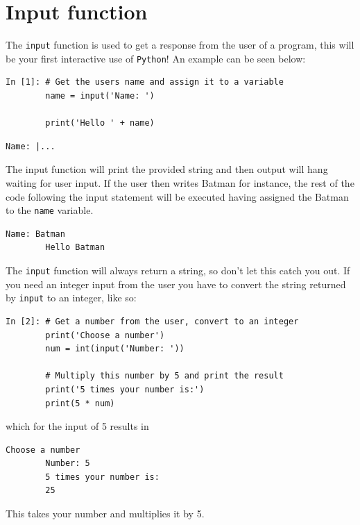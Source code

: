 \section{Input function}
The \texttt{input} function is used to get a response from the user of a program, this will be your first interactive use of \texttt{Python}! An example can be seen below:
\begin{lstlisting}[style=PY] 
In [1]: # Get the users name and assign it to a variable
        name = input('Name: ')
        
        print('Hello ' + name)
\end{lstlisting}
\begin{lstlisting}[style=PY_out] 
        Name: |...
\end{lstlisting}
The input function will print the provided string and then output will hang waiting for user input. If the user then writes Batman for instance, the rest of the code following the input statement will be executed having assigned the Batman to the \texttt{name} variable.
\begin{lstlisting}[style=PY_out] 
        Name: Batman
        Hello Batman
\end{lstlisting}

The \texttt{input} function will always return a string, so don't let this catch you out. If you need an integer input from the user you have to convert the string returned by \texttt{input} to an integer, like so:
\begin{lstlisting}[style=PY] 
In [2]: # Get a number from the user, convert to an integer
        print('Choose a number')
        num = int(input('Number: '))
        
        # Multiply this number by 5 and print the result
        print('5 times your number is:')
        print(5 * num)
\end{lstlisting}
which for the input of 5 results in
\begin{lstlisting}[style=PY_out] 
        Choose a number
        Number: 5
        5 times your number is:
        25
\end{lstlisting} 
This takes your number and multiplies it by 5.



